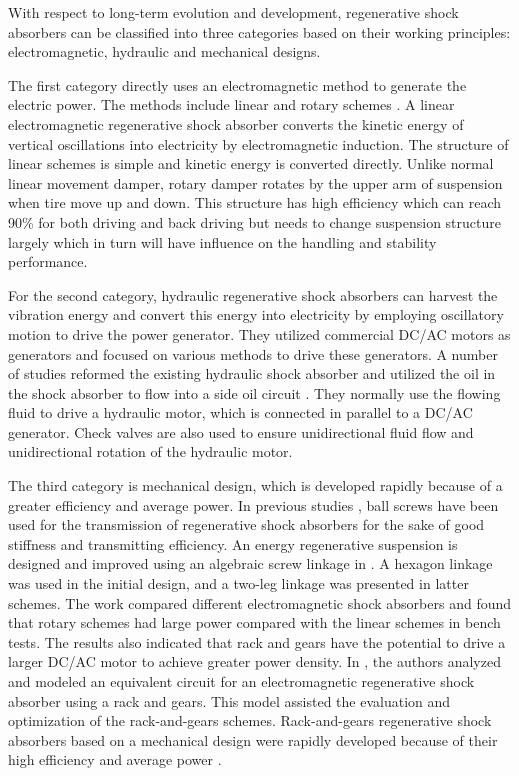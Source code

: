With respect to long-term evolution and development, regenerative shock absorbers can be classified into three categories based on their working principles: electromagnetic, hydraulic and mechanical designs.

The first category directly uses an electromagnetic method to generate the electric power.
The methods include linear \cite{JX_0964-1726-19-4-045003,JX_5737802,JX_ZHANG20121124,JX_2619394820151001,JX_XIE2015385} and rotary schemes \cite{JX_6063995,JX_6023317}.
A linear electromagnetic regenerative shock absorber converts the kinetic energy of vertical oscillations into electricity by electromagnetic induction.
The structure of linear schemes is simple and kinetic energy is converted directly.
Unlike normal linear movement damper, rotary damper rotates by the upper arm of suspension when tire move up and down.
This structure has high efficiency which can reach 90\% for both driving and back driving but needs to change suspension structure largely which in turn will have influence on the handling and stability performance.

For the second category, hydraulic regenerative shock absorbers can harvest the vibration energy and convert this energy into electricity by employing oscillatory motion to drive the power generator.
They utilized commercial DC/AC motors as generators and focused on various methods to drive these generators.
A number of studies reformed the existing hydraulic shock absorber and utilized the oil in the shock absorber to flow into a side oil circuit \cite{JX_doi,JX_ZHANG2015485}.
They normally use the flowing fluid to drive a hydraulic motor, which is connected in parallel to a DC/AC generator.
Check valves are also used to ensure unidirectional fluid flow and unidirectional rotation of the hydraulic motor.

The third category is mechanical design, which is developed rapidly because of a greater efficiency and average power.
In previous studies \cite{JX_6063995,JX_pub1643510,JX_6587850,JX_7057652}, ball screws have been used for the transmission of regenerative shock absorbers for the sake of good stiffness and transmitting efficiency.
An energy regenerative suspension is designed and improved using an algebraic screw linkage in \cite{JX_6587850,JX_7057652}.
A hexagon linkage was used in the initial design, and a two-leg linkage was presented in latter schemes.
The work \cite{JX_Gupta2006} compared different electromagnetic shock absorbers and found that rotary schemes had large power compared with the linear schemes in bench tests.
The results also indicated that rack and gears have the potential to drive a larger DC/AC motor to achieve greater power density.
In \cite{JX_5545646}, the authors analyzed and modeled an equivalent circuit for an electromagnetic regenerative shock absorber using a rack and gears.
This model assisted the evaluation and optimization of the rack-and-gears schemes. Rack-and-gears regenerative shock absorbers based on a mechanical design were rapidly developed because of their high efficiency and average power \cite{JX_6399623,JX_0964}.

